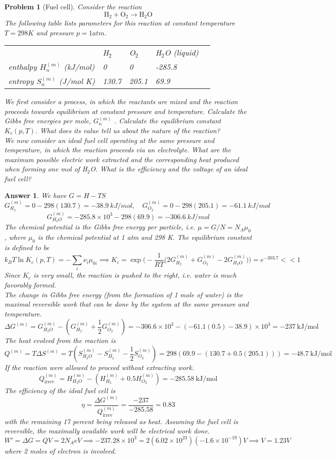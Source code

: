 \documentclass[a4paper]{article}
\newtheorem{ans}{Answer}[section]
\theoremstyle{new}
\newtheorem{qns}{Problem}[section]
\begin{document}
\newpage
\begin{qns}[Fuel cell]
Consider the reaction
$$\text{H}_2+\text{O}_2\rightarrow\text{H}_2\text{O}$$
The following table lists parameters for this reaction at constant temperature $T = 298 K$ and pressure $p = 1 atm$.
\begin{table}[H]
\begin{tabular}{lllll}
         & H$_2$    & O$_2$    & H$_2$O (liquid)    &  \\
enthalpy $H_n^{(m)}$ (kJ/mol) & 0     & 0     & -285.8 &  \\
entropy $S_n^{(m)}$ (J/mol K) & 130.7 & 205.1 & 69.9   & 
\end{tabular}
\end{table}
We first consider a process, in which the reactants are mixed and the reaction proceeds towards equilibrium at constant pressure and temperature. Calculate the Gibbs free energies per mole, $G_n^{(m)}$ . Calculate the equilibrium constant $K_c(p,T)$. What does its value tell us about the nature of the reaction?\\[5pt]
We now consider an ideal fuel cell operating at the same pressure and temperature, in which the reaction proceeds via an electrolyte. What are the maximum possible electric work extracted and the corresponding heat produced when forming one mol of H$_2$O. What is the efficiency and the voltage of an ideal fuel cell?
\end{qns}
\begin{ans}
We have $G=H-TS$
$$G_{H_2}^{(m)}=0-298(130.7)=-38.9~kJ/mol,\quad G_{O_2}^{(m)}=0-298(205.1)=-61.1~kJ/mol$$
$$G_{H_2O}^{(m)}=-285.8\times10^3-298(69.9)=-306.6~kJ/mol$$
The chemical potential is the Gibbs free energy per particle, i.e. $\mu=G/N=N_A\mu_0$, where $\mu_0$ is the chemical potential at 1 atm and 298 K. The equilibrium constant is defined to be
$$k_BT\ln K_c(p,T)=-\sum_i\nu_i\mu_{0i}\implies K_c=\exp\bigg(-\frac{1}{RT}\bigg(2G_{H_2}^{(m)}+G_{O_2}^{(m)}-2G_{H_2O}^{(m)}\bigg)\bigg)=e^{-303.7}<<1$$
Since $K_c$ is very small, the reaction is pushed to the right, i.e. water is much favorably formed.\\[5pt]
The change in Gibbs free energy (from the formation of 1 mole of water) is the maximal reversible work that can be done by the system at the same pressure and temperature. 
$$\Delta G^{(m)}=G^{(m)}_{H_2O}-(G_{H_2}^{(m)}+\frac{1}{2}G_{O_2}^{(m)})=-306.6\times10^3-(-61.1(0.5)-38.9)\times10^3=-237~\text{kJ/mol}$$
The heat evolved from the reaction is
$$Q^{(m)}=T\Delta S^{(m)}=T(S_{H_2O}^{(m)}-S_{H_2}^{(m)}-\frac{1}{2}S_{O_2}^{(m)})=298(69.9-(130.7+0.5(205.1)))=-48.7~\text{kJ/mol}$$
If the reaction were allowed to proceed without extracting work. 
$$Q_{\text{irrev}}^{(m)}=H_{H_2O}^{(m)}-(H_{H_2}^{(m)}+0.5H_{O_2}^{(m)})=-285.58~\text{kJ/mol}$$
The efficiency of the ideal fuel cell is
$$\eta=\frac{\Delta G^{(m)}}{Q_{\text{irrev}}^{(m)}}=\frac{-237}{-285.58}=0.83$$
with the remaining 17 percent being released as heat. Assuming the fuel cell is reversible, the maximally available work will be electrical work done.
$$W'=\Delta G=QV=2N_AeV\implies-237.28\times10^3=2(6.02\times10^{23})(-1.6\times10^{-19})V\implies V=1.23V$$
where 2 moles of electron is involved.
\end{ans}
\end{document}
